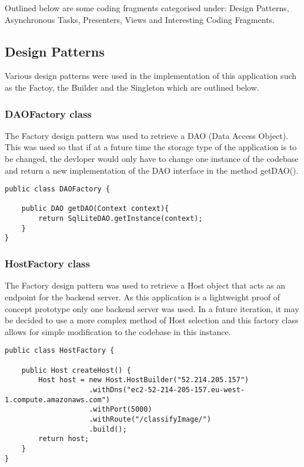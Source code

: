 Outlined below are some coding fragments categorised under: Design Patterns, Asynchronous Tasks, Presenters, Views and Interesting Coding Fragments.

\subsection*{Design Patterns}
Various design patterns were used in the implementation of this application such as the Factoy, the Builder and the Singleton which are outlined below.

\subsubsection*{DAOFactory class}
The Factory design pattern was used to retrieve a DAO (Data Access Object).
This was used so that if at a future time the storage type of the application is to be changed, the devloper would only have to change one instance of the codebase and return a new implementation of the DAO interface in the method getDAO().
\begin{lstlisting}[style=Java]
public class DAOFactory {

    public DAO getDAO(Context context){
        return SqlLiteDAO.getInstance(context);
    }
}
\end{lstlisting}

\subsubsection*{HostFactory class}
The Factory design pattern was used to retrieve a Host object that acts as an endpoint for the backend server.
As this application is a lightweight proof of concept prototype only one backend server was used.
In a future iteration, it may be decided to use a more complex method of Host selection and this factory class allows for simple modification to the codebase in this instance.
\begin{lstlisting}[style=Java]
public class HostFactory {

    public Host createHost() {
        Host host = new Host.HostBuilder("52.214.205.157")
                    .withDns("ec2-52-214-205-157.eu-west-1.compute.amazonaws.com")
                    .withPort(5000)
                    .withRoute("/classifyImage/")
                    .build();
        return host;
    }
}
\end{lstlisting}

